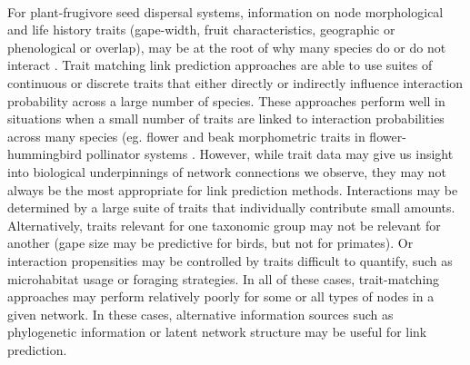 \documentclass[num-refs]{wiley-article}%
\begin{document}
\paragraph*{}
For plant-frugivore seed dispersal systems, information on node morphological and life history traits (gape-width, fruit characteristics, geographic or phenological or overlap), may be at the root of why many species do or do not interact \cite{bender2018morphological,gonzalez2015relative, moran2010can}. Trait matching link prediction approaches are able to use suites of continuous or discrete traits that either directly or indirectly influence interaction probability across a large number of species. These approaches perform well in situations when a small number of traits are linked to interaction probabilities across many species (eg. flower and beak morphometric traits in flower-hummingbird pollinator systems \cite{pichler2020}. However, while trait data may give us insight into biological underpinnings of network connections we observe, they may not always be the most appropriate for link prediction methods. Interactions may be determined by a large suite of traits that individually contribute small amounts. Alternatively, traits relevant for one taxonomic group may not be relevant for another (gape size may be predictive for birds, but not for primates). Or interaction propensities may be controlled by traits difficult to quantify, such as microhabitat usage or foraging strategies. In all of these cases, trait-matching approaches may perform relatively poorly for some or all types of nodes in a given network. In these cases, alternative information sources such as phylogenetic information or latent network structure may be useful for link prediction. 
\end{document}
